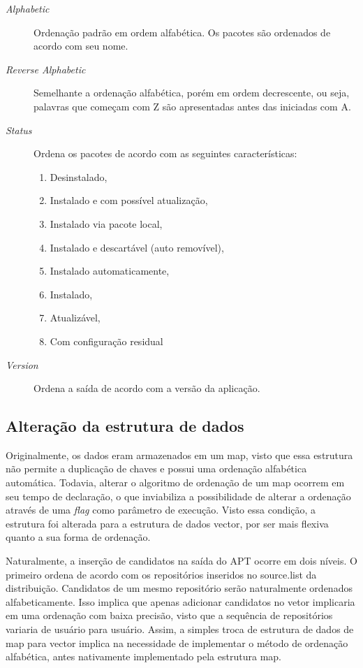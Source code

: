 \begin{description}
	\item [\textit{Alphabetic}] Ordenação padrão em ordem alfabética. Os pacotes são ordenados de acordo com seu nome.
	\item [\textit{Reverse Alphabetic}] Semelhante a ordenação alfabética, porém em ordem decrescente, ou seja, palavras que começam com {\code Z} são apresentadas antes das iniciadas com {\code A}.
	\item [\textit{Status}] Ordena os pacotes de acordo com as seguintes características:
	\begin{enumerate}
		\item Desinstalado,
		\item Instalado e com possível atualização,
		\item Instalado via pacote local,
		\item Instalado e descartável (auto removível),
		\item Instalado automaticamente,
		\item Instalado,
		\item Atualizável,
		\item Com configuração residual
	\end{enumerate}
	\item [\textit{Version}] Ordena a saída de acordo com a versão da aplicação.
\end{description}

\subsection*{Alteração da estrutura de dados} %
\label{sub:altera_o_da_estrutuda_de_dados}

Originalmente, os dados eram armazenados em um {\code map}, visto que essa estrutura não permite a duplicação de chaves e possui uma ordenação alfabética automática. Todavia, alterar o algoritmo de ordenação de um {\code map} ocorrem em seu tempo de declaração, o que  inviabiliza a possibilidade de alterar a ordenação através de uma \textit{flag} como parâmetro de execução. Visto essa condição, a estrutura foi alterada para a estrutura de dados {\code vector}, por ser mais flexiva quanto a sua forma de ordenação.

Naturalmente, a inserção de candidatos na saída do APT ocorre  em dois níveis. O primeiro ordena de acordo com os repositórios inseridos no {\code source.list} da distribuição. Candidatos de um mesmo repositório serão naturalmente ordenados alfabeticamente. Isso implica que apenas adicionar candidatos no vetor implicaria em uma ordenação com baixa precisão, visto que a sequência de repositórios variaria de usuário para usuário. Assim, a simples troca de estrutura de dados de {\code map} para {\code vector} implica na necessidade de implementar o método de ordenação alfabética, antes nativamente implementado pela estrutura {\code map}.

